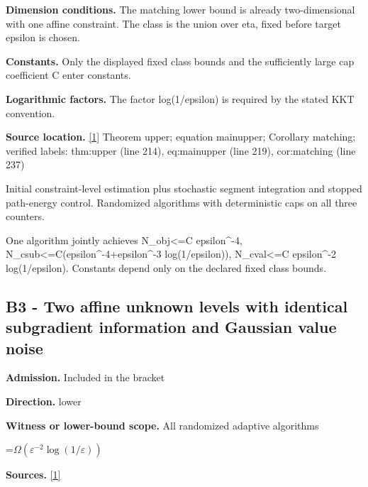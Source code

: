 \documentclass[10pt,a4paper]{article}
\newcommand{\AtlasMath}[1]{\par\begingroup\centering\setbox0=\hbox{$\displaystyle #1$}\ifdim\wd0>1.4\linewidth\typeout{ATLAS WIDE FORMULA: \the\wd0}\fi\ifdim\wd0>\linewidth\resizebox{\linewidth}{!}{\box0}\else\box0\fi\par\endgroup}
\begin{document}
\textbf{Dimension conditions.} The matching lower bound is already two-dimensional with one affine constraint. The class is the union over eta, fixed before target epsilon is chosen.



\textbf{Constants.} Only the displayed fixed class bounds and the sufficiently large cap coefficient C enter constants.



\textbf{Logarithmic factors.} The factor log(1/epsilon) is required by the stated KKT convention.



\textbf{Source location.} \href{https://github.com/WU-Wendao/Colombo/blob/main/colombo_sensorium/Complexity_altas/data/sources/colombo/N10/manuscript.pdf}{[1]} Theorem upper; equation mainupper; Corollary matching; verified labels: thm:upper (line 214), eq:mainupper (line 219), cor:matching (line 237)



Initial constraint-level estimation plus stochastic segment integration and stopped path-energy control. Randomized algorithms with deterministic caps on all three counters.



One algorithm jointly achieves N\_obj<=C epsilon\textasciicircum{}-4, N\_csub<=C(epsilon\textasciicircum{}-4+epsilon\textasciicircum{}-3 log(1/epsilon)), N\_cval<=C epsilon\textasciicircum{}-2 log(1/epsilon). Constants depend only on the declared fixed class bounds.



\subsection{B3 - Two affine unknown levels with identical subgradient information and Gaussian value noise}


\textbf{Admission.} Included in the bracket



\textbf{Direction.} lower



\textbf{Witness or lower-bound scope.} All randomized adaptive algorithms



\AtlasMath{\Omega(\varepsilon^{-2}\log(1/\varepsilon))}


\textbf{Sources.} \href{https://github.com/WU-Wendao/Colombo/blob/main/colombo_sensorium/Complexity_altas/data/sources/colombo/N10/manuscript.pdf}{[1]}
\end{document}
